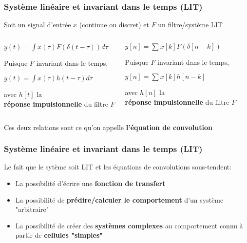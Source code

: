\documentclass{beamer}
\begin{document}
\begin{frame} 
\frametitle{Système linéaire et invariant dans le temps (LIT) }
Soit un signal d'entrée $x$ (continue ou discret) et $F$ un filtre/système LIT\\
\vspace{1 cm}
\begin{columns}
\column{70mm}
\begin{center}
$y(t) = \displaystyle \int x(\tau) F(\delta(t-\tau) )d\tau$\\
\vspace{0.5cm}

Puisque $F$ invariant dans le temps,\\
\vspace{0.5cm}

$y(t) = \displaystyle \int x(\tau) h(t-\tau) d\tau$\\
\vspace{0.5cm}

avec $h[t]$ la\\ \textbf{réponse impulsionnelle} du filtre $F$

\end{center}

\column{60mm}
\begin{center}

$ y[n] = \displaystyle\sum x[k]  F(\delta[n-k]) $ \\
\vspace{0.5cm}

Puisque $F$ invariant dans le temps,\\
\vspace{0.5cm}

$ y[n] = \displaystyle\sum x[k]  h[n-k] $ \\
\vspace{0.5cm}

avec $h[n]$ la\\ \textbf{réponse impulsionnelle} du filtre $F$

\end{center}
\end{columns}
\begin{block}{}
Ces deux relations sont ce qu'on appelle \textbf{l'équation de convolution}
\end{block}
\end{frame}

\begin{frame}
\frametitle{Système linéaire et invariant dans le temps (LIT)}
Le fait que le sytème soit LIT et les équations de convolutions sous-tendent: \\
\vspace{1cm}
\begin{itemize}
\item La possibilité d'écrire une \textbf{fonction de transfert}
\item La possibilité de \textbf{prédire/calculer le comportement} d'un système "arbitraire"
\item La possibilité de créer des \textbf{systèmes complexes} au comportement connu à partir de \textbf{cellules "simples"}
\end{itemize}

\end{frame} 
\end{document}
